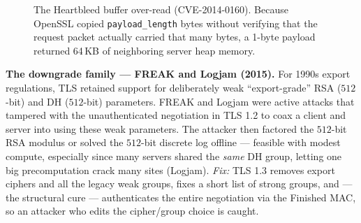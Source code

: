 \begin{figure}[htbp]
\centering
{}
\caption{The Heartbleed buffer over-read (CVE-2014-0160). Because OpenSSL copied \texttt{payload\_length} bytes without verifying that the request packet actually carried that many bytes, a 1-byte payload returned 64\,KB of neighboring server heap memory.}
\label{ch25:fig-heartbleed}
\end{figure}

\begin{attackbox}
\textbf{The downgrade family --- FREAK and Logjam (2015).} For 1990s export
regulations, TLS retained support for deliberately weak ``export-grade'' RSA
($512$-bit) and DH ($512$-bit) parameters. FREAK and Logjam were active attacks
that tampered with the unauthenticated negotiation in TLS 1.2 to coax a client
and server into using these weak parameters. The attacker then factored the
$512$-bit RSA modulus or solved the $512$-bit discrete log offline --- feasible with
modest compute, especially since many servers shared the \emph{same} DH group, letting
one big precomputation crack many sites (Logjam). \emph{Fix:} TLS 1.3 removes
export ciphers and all the legacy weak groups, fixes a short list of strong groups,
and --- the structural cure --- authenticates the entire negotiation via the Finished
MAC, so an attacker who edits the cipher/group choice is caught.
\end{attackbox}


